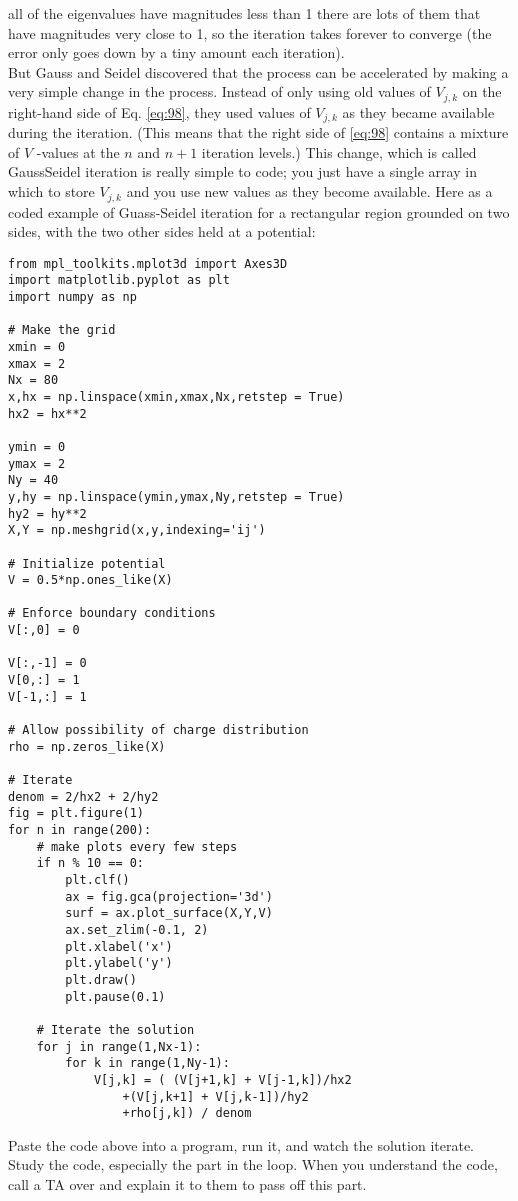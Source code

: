 all of the eigenvalues have magnitudes less than 1 there are lots of them that have
magnitudes very close to 1, so the iteration takes forever to converge (the error
only goes down by a tiny amount each iteration). \\ 
But Gauss and Seidel discovered that the process can be accelerated by making
a very simple change in the process. Instead of only using old values of $V_{j,k}$ on
the right-hand side of Eq. \eqref{eq:98}, they used values of $V_{j,k}$ as they became available
during the iteration. (This means that the right side of \eqref{eq:98} contains a mixture
of $V$ -values at the $n$ and $n +1$ iteration levels.) This change, which is called GaussSeidel iteration is really simple to code; you just have a single array in which to
store $V_{j,k}$ and you use new values as they become available. Here as a coded
example of Guass-Seidel iteration for a rectangular region grounded on two sides,
with the two other sides held at a potential:
\begin{lstlisting}
from mpl_toolkits.mplot3d import Axes3D
import matplotlib.pyplot as plt
import numpy as np

# Make the grid
xmin = 0
xmax = 2
Nx = 80
x,hx = np.linspace(xmin,xmax,Nx,retstep = True)
hx2 = hx**2

ymin = 0
ymax = 2
Ny = 40
y,hy = np.linspace(ymin,ymax,Ny,retstep = True)
hy2 = hy**2
X,Y = np.meshgrid(x,y,indexing='ij')

# Initialize potential
V = 0.5*np.ones_like(X)

# Enforce boundary conditions
V[:,0] = 0

V[:,-1] = 0
V[0,:] = 1
V[-1,:] = 1

# Allow possibility of charge distribution
rho = np.zeros_like(X)

# Iterate
denom = 2/hx2 + 2/hy2
fig = plt.figure(1)
for n in range(200):
	# make plots every few steps
	if n % 10 == 0:
		plt.clf()
		ax = fig.gca(projection='3d')
		surf = ax.plot_surface(X,Y,V)
		ax.set_zlim(-0.1, 2)
		plt.xlabel('x')
		plt.ylabel('y')
		plt.draw()
		plt.pause(0.1)

	# Iterate the solution
	for j in range(1,Nx-1):
		for k in range(1,Ny-1):
			V[j,k] = ( (V[j+1,k] + V[j-1,k])/hx2
				+(V[j,k+1] + V[j,k-1])/hy2
				+rho[j,k]) / denom
\end{lstlisting}
\begin{problem}\label{P9.2}  Paste the code above into a program, run it, and watch the solution iterate.
Study the code, especially the part in the loop. When you understand the
code, call a TA over and explain it to them to pass off this part.
\end{problem}


